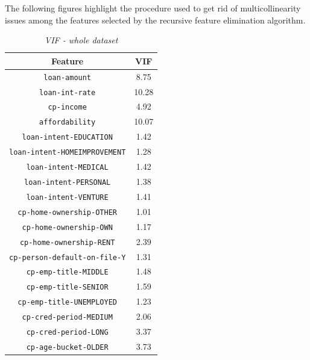 \documentclass[a4paper,12pt]{article}
\begin{document}
        The following figures highlight the procedure used to get rid of multicollinearity issues among the features 
        selected by the recursive feature elimination algorithm.

            \begin{table}[H]
                \centering
                    \begin{tabular}{|c | c|} 
                        \hline
                            Feature & VIF \\ [0.5ex] 
                            \hline\hline
                            \texttt{loan-amount} & 8.75 \\
                            \texttt{loan-int-rate} & 10.28 \\
                            \texttt{cp-income} & 4.92 \\
                            \texttt{affordability} & 10.07 \\
                            \texttt{loan-intent-EDUCATION} & 1.42 \\
                            \texttt{loan-intent-HOMEIMPROVEMENT} & 1.28 \\
                            \texttt{loan-intent-MEDICAL} & 1.42 \\
                            \texttt{loan-intent-PERSONAL} & 1.38 \\
                            \texttt{loan-intent-VENTURE} & 1.41 \\
                            \texttt{cp-home-ownership-OTHER} & 1.01 \\
                            \texttt{cp-home-ownership-OWN} & 1.17 \\
                            \texttt{cp-home-ownership-RENT} & 2.39 \\
                            \texttt{cp-person-default-on-file-Y} & 1.31 \\
                            \texttt{cp-emp-title-MIDDLE} & 1.48 \\
                            \texttt{cp-emp-title-SENIOR} & 1.59 \\
                            \texttt{cp-emp-title-UNEMPLOYED} & 1.23 \\
                            \texttt{cp-cred-period-MEDIUM} & 2.06 \\
                            \texttt{cp-cred-period-LONG} & 3.37 \\
                            \texttt{cp-age-bucket-OLDER} & 3.73 \\ [1ex]
                        \hline
                    \end{tabular}
                    \caption{\textit{VIF - whole dataset}}
                    \label{table:VIF_general}
            \end{table}
\end{document}

